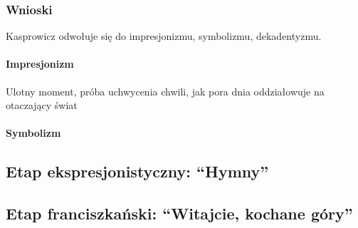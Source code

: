 \documentclass{article}
\begin{document}
\subsubsection{Wnioski}
Kasprowicz odwołuje się do impresjonizmu, symbolizmu, dekadentyzmu.
\paragraph{Impresjonizm}
Ulotny moment, próba uchwycenia chwili, jak pora dnia oddziałowuje na otaczający świat
\paragraph{Symbolizm}

\subsection{Etap ekspresjonistyczny: ``Hymny''}
\subsection{Etap franciszkański: ``Witajcie, kochane góry''}
\end{document}

